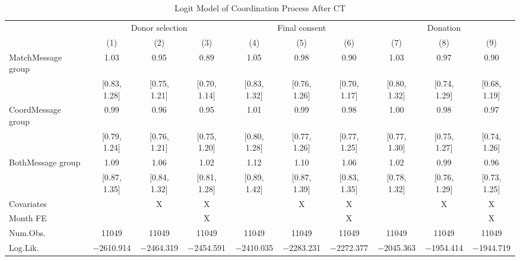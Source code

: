 \documentclass[12pt, a4paper]{article}
\begin{document}
\begin{table}[H]

\caption{\label{tab:logit-coordinate}Logit Model of Coordination Process After CT}
\centering
\fontsize{8}{10}\selectfont
\begin{threeparttable}
\begin{tabular}[t]{lccccccccc}
\toprule
\multicolumn{1}{c}{ } & \multicolumn{3}{c}{Donor selection} & \multicolumn{3}{c}{Final consent} & \multicolumn{3}{c}{Donation} \\
\cmidrule(l{3pt}r{3pt}){2-4} \cmidrule(l{3pt}r{3pt}){5-7} \cmidrule(l{3pt}r{3pt}){8-10}
  & (1) & (2) & (3) & (4) & (5) & (6) & (7) & (8) & (9)\\
\midrule
MatchMessage group & \num{1.03} & \num{0.95} & \num{0.89} & \num{1.05} & \num{0.98} & \num{0.90} & \num{1.03} & \num{0.97} & \num{0.90}\\
 & {}[\num{0.83}, \num{1.28}] & {}[\num{0.75}, \num{1.21}] & {}[\num{0.70}, \num{1.14}] & {}[\num{0.83}, \num{1.32}] & {}[\num{0.76}, \num{1.26}] & {}[\num{0.70}, \num{1.17}] & {}[\num{0.80}, \num{1.32}] & {}[\num{0.74}, \num{1.29}] & {}[\num{0.68}, \num{1.19}]\\
CoordMessage group & \num{0.99} & \num{0.96} & \num{0.95} & \num{1.01} & \num{0.99} & \num{0.98} & \num{1.00} & \num{0.98} & \num{0.97}\\
 & {}[\num{0.79}, \num{1.24}] & {}[\num{0.76}, \num{1.21}] & {}[\num{0.75}, \num{1.20}] & {}[\num{0.80}, \num{1.28}] & {}[\num{0.77}, \num{1.26}] & {}[\num{0.77}, \num{1.25}] & {}[\num{0.77}, \num{1.30}] & {}[\num{0.75}, \num{1.27}] & {}[\num{0.74}, \num{1.26}]\\
BothMessage group & \num{1.09} & \num{1.06} & \num{1.02} & \num{1.12} & \num{1.10} & \num{1.06} & \num{1.02} & \num{0.99} & \num{0.96}\\
 & {}[\num{0.87}, \num{1.35}] & {}[\num{0.84}, \num{1.32}] & {}[\num{0.81}, \num{1.28}] & {}[\num{0.89}, \num{1.42}] & {}[\num{0.87}, \num{1.39}] & {}[\num{0.83}, \num{1.35}] & {}[\num{0.78}, \num{1.32}] & {}[\num{0.76}, \num{1.29}] & {}[\num{0.73}, \num{1.25}]\\
\midrule
Covariates &  & X & X &  & X & X &  & X & X\\
Month FE &  &  & X &  &  & X &  &  & X\\
Num.Obs. & \num{11049} & \num{11049} & \num{11049} & \num{11049} & \num{11049} & \num{11049} & \num{11049} & \num{11049} & \num{11049}\\
Log.Lik. & \num{-2610.914} & \num{-2464.319} & \num{-2454.591} & \num{-2410.035} & \num{-2283.231} & \num{-2272.377} & \num{-2045.363} & \num{-1954.414} & \num{-1944.719}\\

\end{tabular}
\end{threeparttable}
\end{table}
\end{document}
